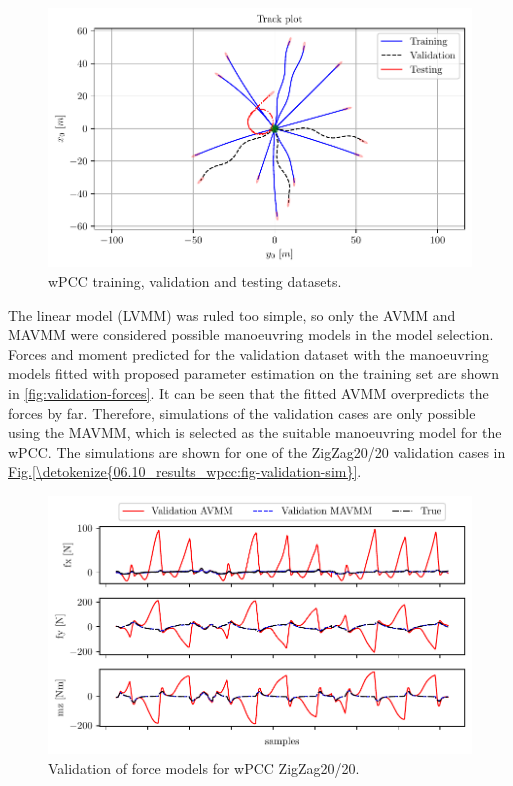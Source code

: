\begin{figure}[!htb]
\centering
\includegraphics[width=\linewidth]{kappa/images/3.pdf}
\caption{wPCC training, validation and testing datasets.}
\label{fig:wpcc_datasets}
\end{figure}

The linear model (LVMM) was ruled too simple, so only the AVMM and MAVMM were considered possible manoeuvring models in the model selection.
Forces and moment predicted for the validation dataset with the manoeuvring models fitted with proposed parameter estimation on the training set are shown in \autoref{fig:validation-forces}. It can be seen that the fitted AVMM overpredicts the forces by far. Therefore, simulations of the validation cases are only possible using the MAVMM, which is selected as the suitable manoeuvring model for the wPCC.
The simulations are shown for one of the ZigZag20/20 validation cases in \hyperref[\detokenize{06.10_results_wpcc:fig-validation-sim}]{Fig.\@ \ref{\detokenize{06.10_results_wpcc:fig-validation-sim}}}.

\begin{figure}[!htb]
\centering
\includegraphics{kappa/images/7.pdf}
\caption{Validation of force models for wPCC ZigZag20/20.}\label{fig:validation-forces}
\end{figure}

